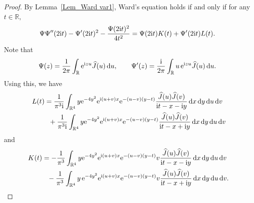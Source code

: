 \documentclass[pdftex]{sigma}
\numberwithin{equation}{section}
\newcommand{\R}{{\mathbb R}}
\newcommand{\1}{\chi}
\def\wh{\widehat}
\begin{document}
\begin{proof}
	
	By Lemma~\ref{Lem_Ward var1}, Ward's equation holds if and only if for any $t \in \R,$
	\begin{gather} \label{Ward var1}
		\Psi \Psi''(2{\rm i}t) - \Psi'(2{\rm i}t)^2-\dfrac{\Psi(2{\rm i}t)^2}{4t^2}= \Psi(2{\rm i}t) K(t)+\Psi'(2{\rm i}t) L(t).
	\end{gather}
	Note that
	\begin{gather*}
		\Psi(z)=\frac{1}{2\pi} \int_{\R} {\rm e}^{{\rm i}zu} \wh{J}(u)\,{\rm d}u, \qquad \Psi'(z)=\frac{{\rm i}}{2\pi} \int_{\R} u\,{\rm e}^{{\rm i}zu} \wh{J}(u)\,{\rm d}u.
	\end{gather*}
	Using this, we have
	\begin{gather*}
			L(t) =\frac{1}{\pi^3 {\rm i}} \int_{ \R^4 } y {\rm e}^{ -4y^2 } {\rm e}^{{\rm i}(u+v)x} {\rm e}^{-(u-v)(y-t)} \frac{\wh{J}(u) \wh{J}(v)}{{\rm i}t-x-{\rm i}y} \,{\rm d}x\,{\rm d}y\,{\rm d}u\,{\rm d}v
			\\
\hphantom{L(t) =}{} +\frac{1}{\pi^3 {\rm i}} \int_{ \R^4 } y {\rm e}^{ -4y^2 } {\rm e}^{{\rm i}(u+v)x} {\rm e}^{-(u-v)(y-t)} \frac{\wh{J}(u) \wh{J}(v)}{{\rm i}t-x+{\rm i}y} \,{\rm d}x\,{\rm d}y\,{\rm d}u\,{\rm d}v
		\end{gather*}
	and
	\begin{gather*}
			K(t) =-\frac{1}{\pi^3 } \int_{ \R^4 } y {\rm e}^{ -4y^2 } {\rm e}^{{\rm i}(u+v)x} {\rm e}^{-(u-v)(y-t)} v \frac{\wh{J}(u) \wh{J}(v)}{{\rm i}t-x-{\rm i}y} \,{\rm d}x\,{\rm d}y\,{\rm d}u\,{\rm d}v
			\\
\hphantom{K(t) =}{}
 -\frac{1}{\pi^3 } \int_{ \R^4 } y \, {\rm e}^{ -4y^2 } {\rm e}^{{\rm i}(u+v)x} {\rm e}^{-(u-v)(y-t)} v \frac{\wh{J}(u) \wh{J}(v)}{{\rm i}t-x+{\rm i}y} \,{\rm d}x\,{\rm d}y\,{\rm d}u\,{\rm d}v.
		\end{gather*}
	

\end{proof}
\end{document}
